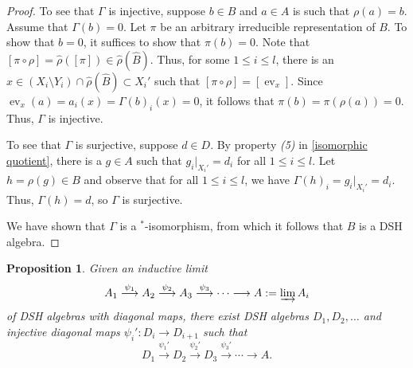 \documentclass[12pt]{amsart}
\numberwithin{equation}{section}
\newtheorem{proposition}[theorem]{Proposition}
\theoremstyle{definition}
\theoremstyle{remark}
\newcommand{\ev}{\operatorname{ev}}
\begin{document}
\begin{proof}
	To see that $\Gamma$ is injective, suppose $b\in B$ and $a\in A$ is such that $\rho(a)=b$. Assume that $\Gamma(b)=0$. Let $\pi$ be an arbitrary irreducible representation of $B$. To show that $b=0$, it suffices to show that $\pi(b)=0$. Note that $[\pi\circ\rho]=\hat{\rho}([\pi])\in\hat{\rho}(\hat{B})$. Thus, for some $1\leq i\leq  l$, there is an $x\in (X_{i}\setminus Y_{i})\cap \hat{\rho}(\hat{B})\subset X_{i}'$ such that $[\pi\circ \rho]=[\ev_{x}]$.  Since $\ev_{x}(a)=a_{i}(x)=\Gamma(b)_{i}(x)=0$, it follows that $\pi(b)=\pi(\rho(a))=0$. Thus, $\Gamma$ is injective.
	
	To see that $\Gamma$ is surjective, suppose $d\in D$. By property \textit{(5)} in \autoref{isomorphic quotient}, there is a $g\in A$ such that $g_{i}|_{X_{i}'}=d_{i}$ for all $1\leq i\leq l$. Let $h=\rho(g)\in B$ and observe that for all $1\leq i\leq  l$, we have $\Gamma(h)_{i}=g_{i}|_{X_{i}'}=d_{i}$. Thus, $\Gamma(h)=d$, so $\Gamma$ is surjective. 
	
	We have shown that $\Gamma$ is a $^*$-isomorphism, from which it follows that $B$ is a DSH algebra. 
\end{proof}

\begin{proposition}
	\label{injective}
	Given an inductive limit 
	$$ 
	A_{1}\overset{\psi_{1}}{\longrightarrow} A_{2}\overset{\psi_{2}}{\longrightarrow} A_{3}\overset{\psi_{3}}{\longrightarrow}\cdots\longrightarrow A:=\varinjlim A_{i}
	$$
	of DSH algebras with diagonal maps, there exist DSH algebras $D_{1},D_{2},\ldots$ and injective diagonal maps $\psi_{i}'\colon D_{i}\to D_{i+1}$ such that 
	$$
	D_{1}\overset{\psi_{1}'}{\longrightarrow} D_{2}\overset{\psi_{2}'}{\longrightarrow} D_{3}\overset{\psi_{3}'}{\longrightarrow}\cdots\longrightarrow A.
	$$
\end{proposition}
\end{document}
